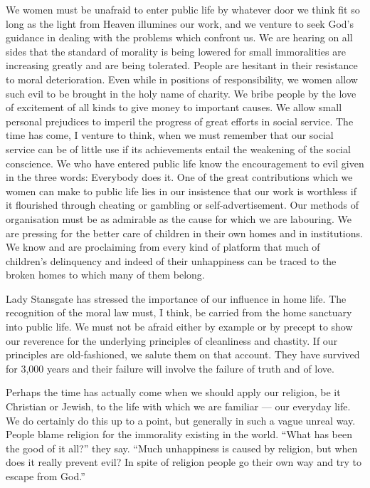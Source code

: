 We women must be unafraid to enter public life by
whatever door we think fit so long as the light from Heaven
illumines our work, and we venture to seek God's guidance
in dealing with the problems which confront us. We are
hearing on all sides that the standard of morality is being
lowered for small immoralities are increasing greatly and
are being tolerated. People are hesitant in their
resistance to moral deterioration. Even while in positions
of responsibility, we women allow such evil to be brought
in the holy name of charity. We bribe people by the love
of excitement of all kinds to give money to important
causes. We allow small personal prejudices to imperil the
progress of great efforts in social service. The time has
come, I venture to think, when we must remember that our
social service can be of little use if its achievements
entail the weakening of the social conscience. We who have
entered public life know the encouragement to evil given in
the three words: Everybody does it. One of the great
contributions which we women can make to public life lies
in our insistence that our work is worthless if it
flourished through cheating or gambling or
self-advertisement. Our methods of organisation must be as
admirable as the cause for which we are labouring. We are
pressing for the better care of children in their own homes
and in institutions. We know and are proclaiming from
every kind of platform that much of children's delinquency
and indeed of their unhappiness can be traced to the broken
homes to which many of them belong.

Lady Stansgate has stressed the importance of our
influence in home life. The recognition of the moral law
must, I think, be carried from the home sanctuary into
public life. We must not be afraid either by example or by
precept to show our reverence for the underlying principles
of cleanliness and chastity. If our principles are
old-fashioned, we salute them on that account. They have
survived for 3,000 years and their failure will involve the
failure of truth and of love.

Perhaps the time has actually come when we should
apply our religion, be it Christian or Jewish, to the life
with which we are familiar --- our everyday life. We do
certainly do this up to a point, but generally in such a
vague unreal way. People blame religion for the immorality
existing in the world. ``What has been the good of it all?''
they say. ``Much unhappiness is caused by religion, but
when does it really prevent evil? In spite of religion
people go their own way and try to escape from God.''

